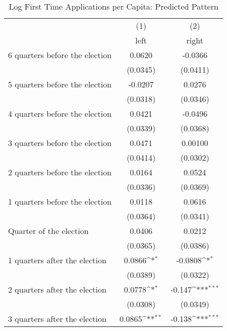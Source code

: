 \begin{table}[htbp]\centering
\def\sym#1{\ifmmode^{#1}\else\(^{#1}\)\fi}
\caption{Log First Time Applications per Capita: Predicted Pattern}
\begin{tabular}{l*{2}{c}}
\hline\hline
                    &\multicolumn{1}{c}{(1)}&\multicolumn{1}{c}{(2)}\\
                    &\multicolumn{1}{c}{left}&\multicolumn{1}{c}{right}\\
\hline
 6 quarters before the election&      0.0620         &     -0.0366         \\
                    &    (0.0345)         &    (0.0411)         \\
[1em]
 5 quarters before the election&     -0.0207         &      0.0276         \\
                    &    (0.0318)         &    (0.0346)         \\
[1em]
 4 quarters before the election&      0.0421         &     -0.0496         \\
                    &    (0.0339)         &    (0.0368)         \\
[1em]
 3 quarters before the election&      0.0471         &     0.00100         \\
                    &    (0.0414)         &    (0.0302)         \\
[1em]
 2 quarters before the election&      0.0164         &      0.0524         \\
                    &    (0.0336)         &    (0.0369)         \\
[1em]
 1 quarters before the election&      0.0118         &      0.0616         \\
                    &    (0.0364)         &    (0.0341)         \\
[1em]
Quarter of the election&      0.0406         &      0.0212         \\
                    &    (0.0365)         &    (0.0386)         \\
[1em]
 1 quarters after the election&      0.0866\sym{*}  &     -0.0808\sym{*}  \\
                    &    (0.0389)         &    (0.0322)         \\
[1em]
 2 quarters after the election&      0.0778\sym{*}  &      -0.147\sym{***}\\
                    &    (0.0308)         &    (0.0349)         \\
[1em]
 3 quarters after the election&      0.0865\sym{**} &      -0.138\sym{***}\\

\end{tabular}
\end{table}
